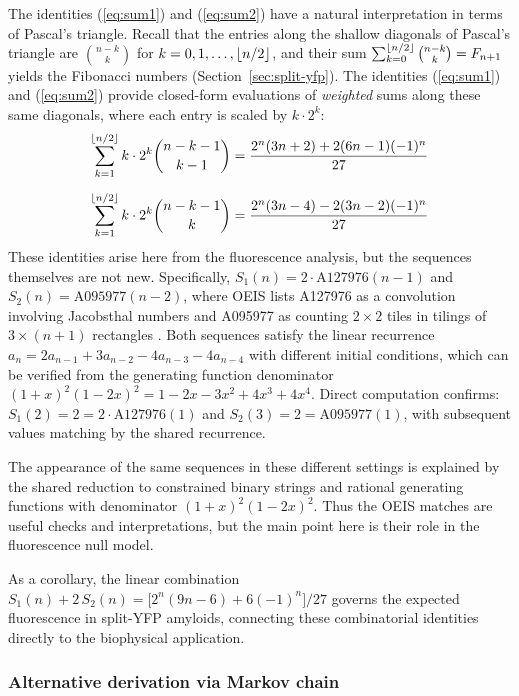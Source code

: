 \documentclass[referee,lineno,pdflatex,sn-mathphys-ay]{sn-jnl}
\DeclarePairedDelimiter\floor{\lfloor}{\rfloor}
\begin{document}
The identities (\ref{eq:sum1}) and (\ref{eq:sum2}) have a natural interpretation in terms of Pascal's triangle. Recall that the entries along the shallow diagonals of Pascal's triangle are $\binom{n-k}{k}$ for $k = 0, 1, \ldots, \floor{n/2}$, and their sum $\sum_{k=0}^{\floor{n/2}} \binom{n-k}{k} = F_{n+1}$ yields the Fibonacci numbers (Section~\ref{sec:split-yfp}). The identities (\ref{eq:sum1}) and (\ref{eq:sum2}) provide closed-form evaluations of \textit{weighted} sums along these same diagonals, where each entry is scaled by $k \cdot 2^k$:
\begin{align}
\sum_{k=1}^{\floor{n/2}} k \cdot 2^k \binom{n-k-1}{k-1} &= \frac{2^n(3n+2) + 2(6n-1)(-1)^n}{27} \label{eq:diag1} \\[6pt]
\sum_{k=1}^{\floor{n/2}} k \cdot 2^k \binom{n-k-1}{k} &= \frac{2^n(3n-4) - 2(3n-2)(-1)^n}{27} \label{eq:diag2}
\end{align}
These identities arise here from the fluorescence analysis, but the sequences themselves are not new. Specifically, $S_1(n) = 2 \cdot \text{A127976}(n-1)$ and $S_2(n) = \text{A095977}(n-2)$, where OEIS lists A127976 as a convolution involving Jacobsthal numbers and A095977 as counting $2 \times 2$ tiles in tilings of $3 \times (n+1)$ rectangles \citep{oeisA127976,oeisA095977}. Both sequences satisfy the linear recurrence $a_n = 2a_{n-1} + 3a_{n-2} - 4a_{n-3} - 4a_{n-4}$ with different initial conditions, which can be verified from the generating function denominator $(1+x)^2(1-2x)^2 = 1 - 2x - 3x^2 + 4x^3 + 4x^4$. Direct computation confirms: $S_1(2) = 2 = 2 \cdot \text{A127976}(1)$ and $S_2(3) = 2 = \text{A095977}(1)$, with subsequent values matching by the shared recurrence.

The appearance of the same sequences in these different settings is explained by the shared reduction to constrained binary strings and rational generating functions with denominator $(1+x)^2(1-2x)^2$. Thus the OEIS matches are useful checks and interpretations, but the main point here is their role in the fluorescence null model.

As a corollary, the linear combination $S_1(n) + 2\,S_2(n) = \bigl[2^n(9n-6) + 6(-1)^n\bigr]/27$ governs the expected fluorescence in split-YFP amyloids, connecting these combinatorial identities directly to the biophysical application.

\subsubsection{Alternative derivation via Markov chain}
\end{document}
